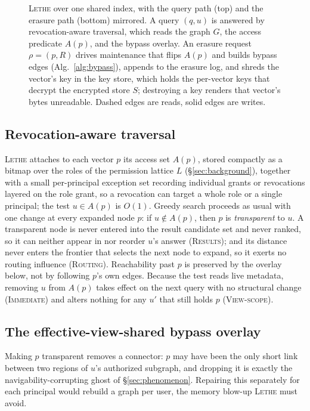 \documentclass[sigconf, nonacm, review]{acmart}
\begin{document}
\begin{figure}[t]
{%
}
\caption{\textsc{Lethe} over one shared index, with the query path (top) and the
erasure path (bottom) mirrored. A query $(q,u)$ is answered by
revocation-aware traversal, which reads the graph $G$, the access predicate
$A(p)$, and the bypass overlay. An erasure request $\rho=(p,R)$ drives
maintenance that flips $A(p)$ and builds bypass edges
(Alg.~\ref{alg:bypass}), appends to the erasure log, and shreds the
vector's key in the key store, which holds the per-vector keys that decrypt
the encrypted store $S$; destroying a key renders that vector's bytes
unreadable. Dashed edges are reads, solid edges are writes.}
\label{fig:arch}
\end{figure}


\subsection{Revocation-aware traversal}

\textsc{Lethe} attaches to each vector $p$ its access set $A(p)$, stored compactly
as a bitmap over the roles of the permission lattice $L$
(\S\ref{sec:background}), together with a small per-principal exception
set recording individual grants or revocations layered on the role grant, so
a revocation can target a whole role or a single principal; the test
$u\in A(p)$ is $O(1)$. Greedy
search proceeds as usual with one change at every expanded node $p$: if
$u\notin A(p)$, then $p$ is \emph{transparent} to $u$. A transparent node is
never entered into the result candidate set and never ranked, so it can
neither appear in nor reorder $u$'s answer (\textsc{Results}); and its
distance never enters the frontier that selects the next node to expand, so
it exerts no routing influence (\textsc{Routing}). Reachability past $p$ is
preserved by the overlay below, not by following $p$'s own edges. Because
the test reads live metadata, removing $u$ from $A(p)$ takes effect on the
next query with no structural change (\textsc{Immediate}) and alters nothing
for any $u'$ that still holds $p$ (\textsc{View-scope}).

\subsection{The effective-view-shared bypass overlay}

Making $p$ transparent removes a connector: $p$ may have been the only short
link between two regions of $u$'s authorized subgraph, and dropping it is
exactly the navigability-corrupting ghost of \S\ref{sec:phenomenon}.
Repairing this separately for each principal would rebuild a graph per user,
the memory blow-up \textsc{Lethe} must avoid.
\end{document}

